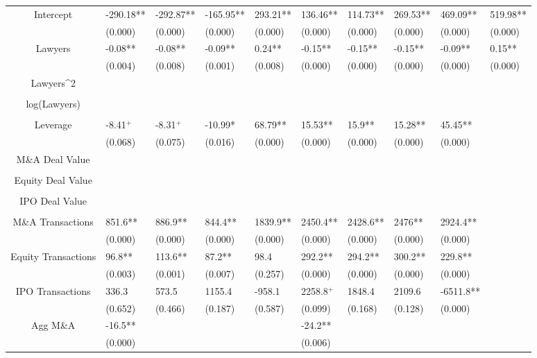 \documentclass{article}
\begin{document}
\begin{table}[H]
\begin{tabular}{|clllllllll|}
Intercept & -290.18** & -292.87** & -165.95** & 293.21** & 136.46** & 114.73** & 269.53** & 469.09** & 519.98** \\
   & (0.000) & (0.000) & (0.000) & (0.000) & (0.000) & (0.000) & (0.000) & (0.000) & (0.000) \\
  Lawyers & -0.08** & -0.08** & -0.09** & 0.24** & -0.15** & -0.15** & -0.15** & -0.09** & 0.15** \\
   & (0.004) & (0.008) & (0.001) & (0.008) & (0.000) & (0.000) & (0.000) & (0.000) & (0.000) \\
  Lawyers^2 &  &  &  &  &  &  &  &  &  \\
   &  &  &  &  &  &  &  &  &  \\
  log(Lawyers) &  &  &  &  &  &  &  &  &  \\
   &  &  &  &  &  &  &  &  &  \\
  Leverage & -8.41$^{+}$ & -8.31$^{+}$ & -10.99* & 68.79** & 15.53** & 15.9** & 15.28** & 45.45** &  \\
   & (0.068) & (0.075) & (0.016) & (0.000) & (0.000) & (0.000) & (0.000) & (0.000) &  \\
  M\&A Deal Value &  &  &  &  &  &  &  &  &  \\
   &  &  &  &  &  &  &  &  &  \\
  Equity Deal Value &  &  &  &  &  &  &  &  &  \\
   &  &  &  &  &  &  &  &  &  \\
  IPO Deal Value &  &  &  &  &  &  &  &  &  \\
   &  &  &  &  &  &  &  &  &  \\
  M\&A Transactions & 851.6** & 886.9** & 844.4** & 1839.9** & 2450.4** & 2428.6** & 2476** & 2924.4** &  \\
   & (0.000) & (0.000) & (0.000) & (0.000) & (0.000) & (0.000) & (0.000) & (0.000) &  \\
  Equity Transactions & 96.8** & 113.6** & 87.2** & 98.4 & 292.2** & 294.2** & 300.2** & 229.8** &  \\
   & (0.003) & (0.001) & (0.007) & (0.257) & (0.000) & (0.000) & (0.000) & (0.000) &  \\
  IPO Transactions & 336.3 & 573.5 & 1155.4 & -958.1 & 2258.8$^{+}$ & 1848.4 & 2109.6 & -6511.8** &  \\
   & (0.652) & (0.466) & (0.187) & (0.587) & (0.099) & (0.168) & (0.128) & (0.000) &  \\
  Agg M\&A & -16.5** &  &  &  & -24.2** &  &  &  &  \\
   & (0.000) &  &  &  & (0.006) &  &  &  &  \\

\end{tabular}
\end{table}
\end{document}
